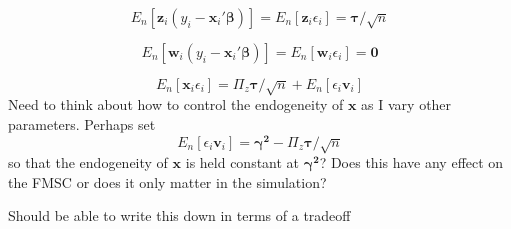 \documentclass[12pt]{article}\usepackage[]{graphicx}\usepackage[]{color}
\theoremstyle{definition}
\begin{document}
$$E_n[\mathbf{z}_i(y_i - \mathbf{x}_i' \boldsymbol{\beta})] = E_n[\mathbf{z}_i\epsilon_i] = \boldsymbol{\tau}/\sqrt{n}$$

$$E_n[\mathbf{w}_i (y_i - \mathbf{x}_i' \boldsymbol{\beta})]= E_n[\mathbf{w}_i\epsilon_i] = \mathbf{0}$$

$$E_n[\mathbf{x}_i \epsilon_i] = \Pi_z \boldsymbol{\tau}/\sqrt{n} + E_n[\epsilon_i \mathbf{v}_i]$$
Need to think about how to control the endogeneity of $\mathbf{x}$ as I vary other parameters. Perhaps set
  $$E_n[\epsilon_i \mathbf{v}_i] = \boldsymbol{\gamma^2} - \Pi_z \boldsymbol{\tau}/\sqrt{n}$$ so that the endogeneity of $\mathbf{x}$ is held constant at $\boldsymbol{\gamma^2}$? Does this have any effect on the FMSC or does it only matter in the simulation?
  
  Should be able to write this down in terms of a tradeoff 
\end{document}

